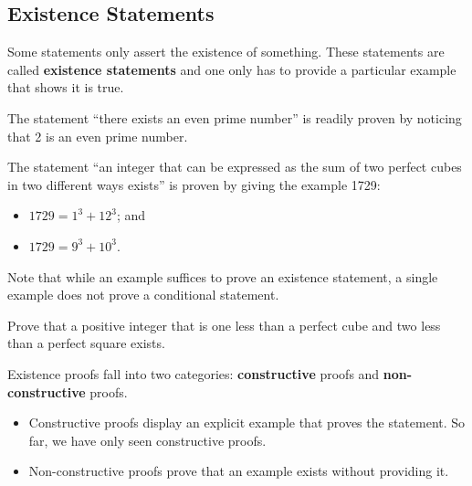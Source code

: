 \subsection{Existence Statements}
Some statements only assert the existence of something. These statements are called \textbf{existence statements} and one only has to provide a particular example that shows it is true. 
\begin{example}
    The statement ``there exists an even prime number'' is readily proven by noticing that 2 is an even prime number.
\end{example}
\begin{example}
    The statement ``an integer that can be expressed as the sum of two perfect cubes in two different ways exists'' is proven by giving the example 1729:
    \begin{itemize}
        \item $1729 = 1^3 + 12^3$; and
        \item $1729 = 9^3 + 10^3$.
    \end{itemize}
\end{example}
Note that while an example suffices to prove an existence statement, a single example does not prove a conditional statement.
\begin{exercise}
    Prove that a positive integer that is one less than a perfect cube and two less than a perfect square exists.
\end{exercise}
Existence proofs fall into two categories: \textbf{constructive} proofs and \textbf{non-constructive} proofs.
\begin{itemize}
    \item Constructive proofs display an explicit example that proves the statement. So far, we have only seen constructive proofs.
    \item Non-constructive proofs prove that an example exists without providing it.
\end{itemize}

